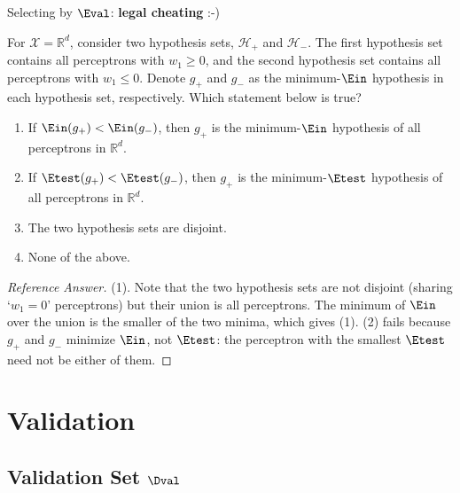 \begin{moral}
    Selecting by \(\Eval\): \textbf{legal cheating} :-)
\end{moral}

\begin{exercise}
    For \(\mathcal{X} = \mathbb{R}^d\), consider two hypothesis sets,
    \(\mathcal{H}_+\) and \(\mathcal{H}_-\). The first hypothesis set contains
    all perceptrons with \(w_1 \ge 0\), and the second hypothesis set contains
    all perceptrons with \(w_1 \le 0\). Denote \(g_+\) and \(g_-\) as the
    minimum-\(\Ein\) hypothesis in each hypothesis set, respectively. Which
    statement below is true?
    \begin{enumerate}[(1)]
        \item If \(\Ein(g_+) < \Ein(g_-)\), then \(g_+\) is the
            minimum-\(\Ein\) hypothesis of all perceptrons in \(\mathbb{R}^d\).
        \item If \(\Etest(g_+) < \Etest(g_-)\), then \(g_+\) is the
            minimum-\(\Etest\) hypothesis of all perceptrons in
            \(\mathbb{R}^d\).
        \item The two hypothesis sets are disjoint.
        \item None of the above.
    \end{enumerate}
\end{exercise}

\begin{proof}[Reference Answer]
    (1). Note that the two hypothesis sets are not disjoint (sharing `\(w_1 =
    0\)' perceptrons) but their union is all perceptrons. The minimum of
    \(\Ein\) over the union is the smaller of the two minima, which gives (1).
    (2) fails because \(g_+\) and \(g_-\) minimize \(\Ein\), not \(\Etest\):
    the perceptron with the smallest \(\Etest\) need not be either of them.
\end{proof}

\section{Validation}\label{sec:validation}


\subsection{Validation Set \texorpdfstring{\(\Dval\)}{Dval}}

